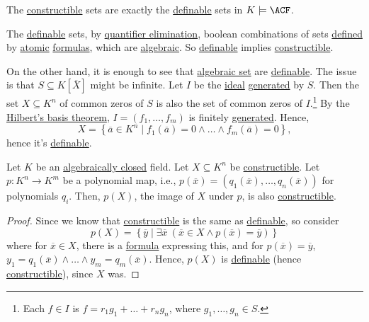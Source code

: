 \begin{remark}
	The \hyperref[def:constructible]{constructible} sets are exactly the \hyperref[def:definable]{definable} sets in \(K \models \ACF\).
\end{remark}
\begin{explanation}
	The \hyperref[def:definable]{definable} sets, by \hyperref[def:quantifier-elimination]{quantifier elimination}, boolean combinations of sets \hyperref[def:definable]{defined} by \hyperref[not:atomic]{atomic} \hyperref[def:formula]{formulas}, which are \hyperref[def:algebraic-set]{algebraic}. So \hyperref[def:definable]{definable} implies \hyperref[def:constructible]{constructible}.

	On the other hand, it is enough to see that \hyperref[def:algebraic-set]{algebraic set} are \hyperref[def:definable]{definable}. The issue is that \(S \subseteq K[\overline{X} ]\) might be infinite. Let \(I\) be the \hyperref[def:ideal]{ideal} \hyperref[def:ideal-generation]{generated} by \(S\). Then the set \(X \subseteq K^n\) of common zeros of \(S\) is also the set of common zeros of \(I\).\footnote{Each \(f\in I\) is \(f = r_1 g_1 + \ldots + r_n g_n\), where \(g_1, \ldots , g_n \in S\).} By the \hyperref[thm:Hilbert-basis]{Hilbert's basis theorem}, \(I = (f_1, \ldots , f_m)\) is finitely \hyperref[def:ideal-generation]{generated}. Hence,
	\[
		X = \left\{ \overline{a} \in K^n \mid f_1(\overline{a} ) = 0 \land \ldots \land f_{m}(\overline{a} ) = 0  \right\},
	\]
	hence it's \hyperref[def:definable]{definable}.
\end{explanation}

\begin{theorem}\label{def:Chevalley}
	Let \(K\) be an \hyperref[def:algebraically-closed]{algebraically closed} field. Let \(X \subseteq K^n\) be \hyperref[def:constructible]{constructible}. Let \(p \colon K^n \to K^m\) be a polynomial map, i.e., \(p(\overline{x} ) = (q_1(\overline{x} ), \ldots , q_n(\overline{x} ))\) for polynomials \(q_i\). Then, \(p(X)\), the image of \(X\) under \(p\), is also \hyperref[def:constructible]{constructible}.
\end{theorem}
\begin{proof}
	Since we know that \hyperref[def:constructible]{constructible} is the same as \hyperref[def:definable]{definable}, so consider
	\[
		p(X) = \left\{ \overline{y} \mid \exists \overline{x} \ (\overline{x} \in X \land p(\overline{x} ) = \overline{y} ) \right\}
	\]
	where for \(\overline{x} \in X\), there is a \hyperref[def:formula]{formula} expressing this, and for \(p(\overline{x} ) = \overline{y} \), \(y_1 = q_1(\overline{x} ) \land \ldots \land y_m=q_m(\overline{x} )\). Hence, \(p(X)\) is \hyperref[def:definable]{definable} (hence \hyperref[def:constructible]{constructible}), since \(X\) was.
\end{proof}

